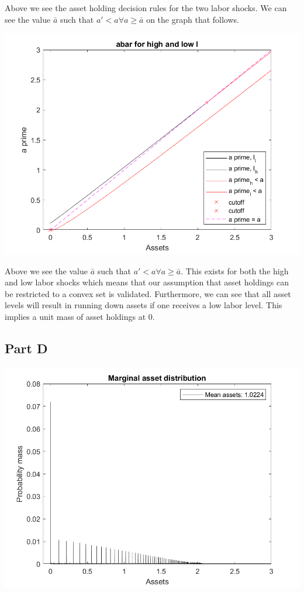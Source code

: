\documentclass[11pt]{article} %
\begin{document}
Above we see the asset holding decision rules for the two labor shocks. We can see the value $\bar{a}$ such that $a'<a \forall a\geq \bar{a}$ on the graph that follows.

\includegraphics{abar}

Above we see the value $\bar{a}$ such that $a'<a \forall a\geq \bar{a}$. This exists for both the high and low labor shocks which means that our assumption that asset holdings can be restricted to a convex set is validated. Furthermore, we can see that all asset levels will result in running down assets if one receives a low labor level. This implies a unit mass of asset holdings at 0.

\subsection{Part D}

\includegraphics{marginal}
\end{document}
